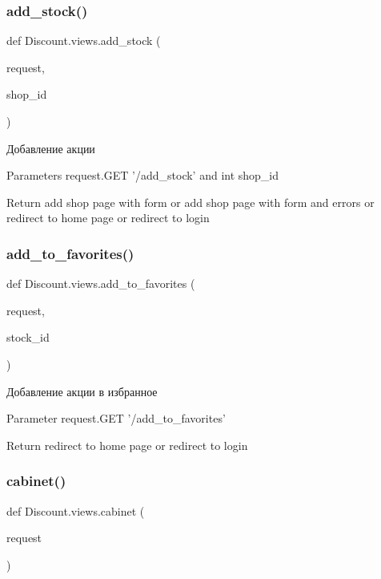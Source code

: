 \subsubsection{\texorpdfstring{add\+\_\+stock()}{add\_stock()}}
{\footnotesize\ttfamily def Discount.\+views.\+add\+\_\+stock (\begin{DoxyParamCaption}\item[{}]{request,  }\item[{}]{shop\+\_\+id }\end{DoxyParamCaption})}

\begin{DoxyVerb}Добавление акции

Parameters
    request.GET '/add_stock' and int shop_id

Return
    add shop page with form
    or
    add shop page with form and errors
    or
    redirect to home page
    or
    redirect to login
\end{DoxyVerb}
 \mbox{\label{namespace_discount_1_1views_ad7b37be22e6ce0661d36af8dfdca6a4a}} 
\subsubsection{\texorpdfstring{add\+\_\+to\+\_\+favorites()}{add\_to\_favorites()}}
{\footnotesize\ttfamily def Discount.\+views.\+add\+\_\+to\+\_\+favorites (\begin{DoxyParamCaption}\item[{}]{request,  }\item[{}]{stock\+\_\+id }\end{DoxyParamCaption})}

\begin{DoxyVerb}Добавление акции в избранное

Parameter
    request.GET '/add_to_favorites'

Return
    redirect to home page
    or
    redirect to login
\end{DoxyVerb}
 \mbox{\label{namespace_discount_1_1views_aaf5ab473564754017d41b391c4ccc689}} 
\subsubsection{\texorpdfstring{cabinet()}{cabinet()}}
{\footnotesize\ttfamily def Discount.\+views.\+cabinet (\begin{DoxyParamCaption}\item[{}]{request }\end{DoxyParamCaption})}

